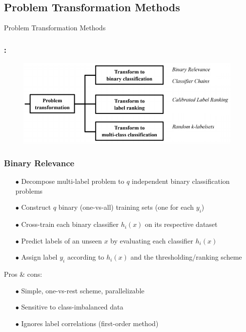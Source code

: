 \documentclass{beamer}
\begin{document}
\subsection{Problem Transformation Methods}
\begin{frame}
\Huge{\centerline{Problem Transformation Methods}}
\end{frame}
\begin{frame}
\frametitle{\insertsection : \insertsubsection}
\begin{figure}
\begin{center}
\includegraphics[scale = 0.7]{images/pt.png}
\end{center}
\end{figure}
\end{frame}
\begin{frame}
\frametitle{Binary Relevance}

\begin{itemize}
\item[$\bullet$] Decompose multi-label problem to $q$ independent binary classification problems
\item[$\bullet$] Construct $q$ binary (one-vs-all) training sets (one for each $y_i$)
\item[$\bullet$] Cross-train each binary classifier $h_i(x)$ on its respective dataset

\item[$\bullet$] Predict labels of an unseen $x$ by evaluating each classifier $h_i(x)$
\item[$\bullet$] Assign label $y_i$ according to $h_i(x)$ and the thresholding/ranking scheme 
\end{itemize}

Pros \& cons:
\begin{itemize}
\item[$\bullet$] Simple, one-vs-rest scheme, parallelizable
\item[$\bullet$] Sensitive to class-imbalanced data
\item[$\bullet$] Ignores label correlations (first-order method)
\end{itemize}

\end{frame}
\end{document}
